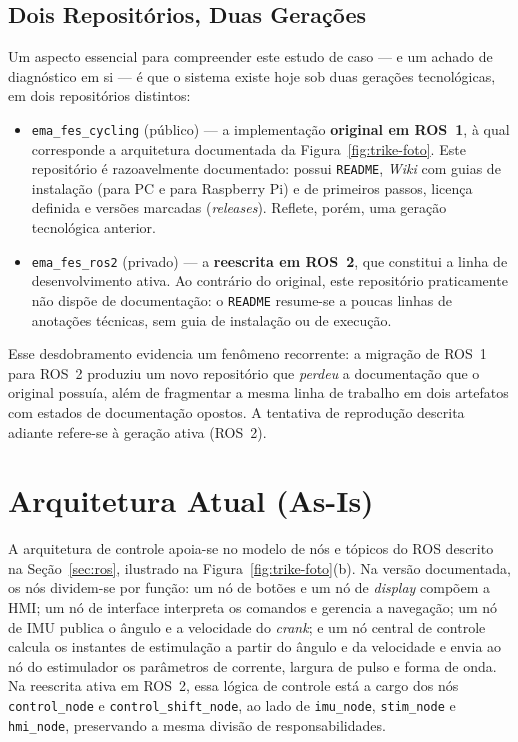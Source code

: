 \subsection{Dois Repositórios, Duas Gerações}
\label{sec:trike-repos}

Um aspecto essencial para compreender este estudo de caso --- e um achado de diagnóstico em
si --- é que o sistema existe hoje sob duas gerações tecnológicas, em dois repositórios
distintos:

\begin{itemize}
	\item \texttt{ema\_fes\_cycling} (público) --- a implementação \textbf{original em
	      ROS~1}, à qual corresponde a arquitetura documentada da
	      Figura~\ref{fig:trike-foto}. Este repositório é razoavelmente documentado: possui
	      \texttt{README}, \emph{Wiki} com guias de instalação (para PC e para Raspberry Pi)
	      e de primeiros passos, licença definida e versões marcadas (\emph{releases}).
	      Reflete, porém, uma geração tecnológica anterior.
	\item \texttt{ema\_fes\_ros2} (privado) --- a \textbf{reescrita em ROS~2}, que constitui
	      a linha de desenvolvimento ativa. Ao contrário do original, este repositório
	      praticamente não dispõe de documentação: o \texttt{README} resume-se a poucas
	      linhas de anotações técnicas, sem guia de instalação ou de execução.
\end{itemize}

Esse desdobramento evidencia um fenômeno recorrente: a migração de ROS~1 para ROS~2 produziu
um novo repositório que \emph{perdeu} a documentação que o original possuía, além de
fragmentar a mesma linha de trabalho em dois artefatos com estados de documentação opostos.
A tentativa de reprodução descrita adiante refere-se à geração ativa (ROS~2).

\section{Arquitetura Atual (As-Is)}
\label{sec:trike-asis}

A arquitetura de controle apoia-se no modelo de nós e tópicos do ROS descrito na
Seção~\ref{sec:ros}, ilustrado na Figura~\ref{fig:trike-foto}(b). Na versão documentada, os
nós dividem-se por função: um nó de botões e um nó de \emph{display} compõem a HMI; um nó de
interface interpreta os comandos e gerencia a navegação; um nó de IMU publica o ângulo e a
velocidade do \emph{crank}; e um nó central de controle calcula os instantes de estimulação a
partir do ângulo e da velocidade e envia ao nó do estimulador os parâmetros de corrente,
largura de pulso e forma de onda. Na reescrita ativa em ROS~2, essa lógica de controle está a
cargo dos nós \texttt{control\_node} e \texttt{control\_shift\_node}, ao lado de
\texttt{imu\_node}, \texttt{stim\_node} e \texttt{hmi\_node}, preservando a mesma divisão de
responsabilidades.

